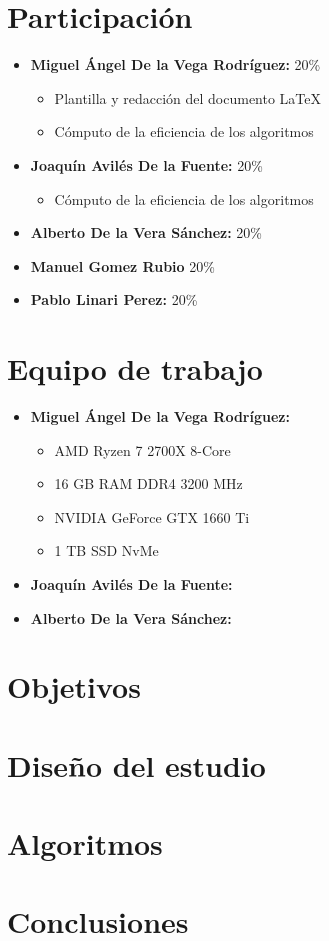 \documentclass[11pt]{article}
\begin{document}
                                                

\tableofcontents %

\newpage %

\section{Participación}
\begin{itemize}
    \item \textbf{Miguel Ángel De la Vega Rodríguez:} 20\%
    \begin{itemize}
        \item Plantilla y redacción del documento \LaTeX
        \item Cómputo de la eficiencia de los algoritmos
    \end{itemize}
    \item \textbf{Joaquín Avilés De la Fuente:} 20\%
    \begin{itemize}
        \item Cómputo de la eficiencia de los algoritmos
    \end{itemize}
    \item \textbf{Alberto De la Vera Sánchez: } 20\%
    \item \textbf{Manuel Gomez Rubio} 20\%
    \item \textbf{Pablo Linari Perez:} 20\%
\end{itemize}

\section{Equipo de trabajo}

\begin{itemize}
    \item \textbf{Miguel Ángel De la Vega Rodríguez:}
        \begin{itemize}
            \item AMD Ryzen 7 2700X 8-Core
            \item 16 GB RAM DDR4 3200 MHz
            \item NVIDIA GeForce GTX 1660 Ti 
            \item 1 TB SSD NvMe 
        \end{itemize}
    \item \textbf{Joaquín Avilés De la Fuente:}
    \item \textbf{Alberto De la Vera Sánchez:}
\end{itemize}

\section{Objetivos}
\section{Diseño del estudio}
\section{Algoritmos}
\section{Conclusiones}
\end{document}

